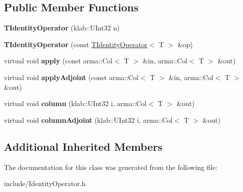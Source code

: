 \subsection*{Public Member Functions}
\begin{DoxyCompactItemize}
\item 
{\bfseries T\+Identity\+Operator} (klab\+::\+U\+Int32 n)\hypertarget{classkl1p_1_1TIdentityOperator_a9034d91ead0141c4cb1f13c7b5eee75f}{}\label{classkl1p_1_1TIdentityOperator_a9034d91ead0141c4cb1f13c7b5eee75f}

\item 
{\bfseries T\+Identity\+Operator} (const \hyperlink{classkl1p_1_1TIdentityOperator}{T\+Identity\+Operator}$<$ T $>$ \&op)\hypertarget{classkl1p_1_1TIdentityOperator_a7f74406ba363d22647558c53af95dfb6}{}\label{classkl1p_1_1TIdentityOperator_a7f74406ba363d22647558c53af95dfb6}

\item 
virtual void {\bfseries apply} (const arma\+::\+Col$<$ T $>$ \&in, arma\+::\+Col$<$ T $>$ \&out)\hypertarget{classkl1p_1_1TIdentityOperator_ad0b77a8e0b1b3cd7ef38fab2565b2ac2}{}\label{classkl1p_1_1TIdentityOperator_ad0b77a8e0b1b3cd7ef38fab2565b2ac2}

\item 
virtual void {\bfseries apply\+Adjoint} (const arma\+::\+Col$<$ T $>$ \&in, arma\+::\+Col$<$ T $>$ \&out)\hypertarget{classkl1p_1_1TIdentityOperator_a9a7423f97c68bf7b5b6945f176638ecd}{}\label{classkl1p_1_1TIdentityOperator_a9a7423f97c68bf7b5b6945f176638ecd}

\item 
virtual void {\bfseries column} (klab\+::\+U\+Int32 i, arma\+::\+Col$<$ T $>$ \&out)\hypertarget{classkl1p_1_1TIdentityOperator_a2b5f3144ce1d48e2c76d415ccc587d3c}{}\label{classkl1p_1_1TIdentityOperator_a2b5f3144ce1d48e2c76d415ccc587d3c}

\item 
virtual void {\bfseries column\+Adjoint} (klab\+::\+U\+Int32 i, arma\+::\+Col$<$ T $>$ \&out)\hypertarget{classkl1p_1_1TIdentityOperator_af87877f80e4fe2abc6c5952839316eb7}{}\label{classkl1p_1_1TIdentityOperator_af87877f80e4fe2abc6c5952839316eb7}

\end{DoxyCompactItemize}
\subsection*{Additional Inherited Members}


The documentation for this class was generated from the following file\+:\begin{DoxyCompactItemize}
\item 
include/Identity\+Operator.\+h\end{DoxyCompactItemize}

